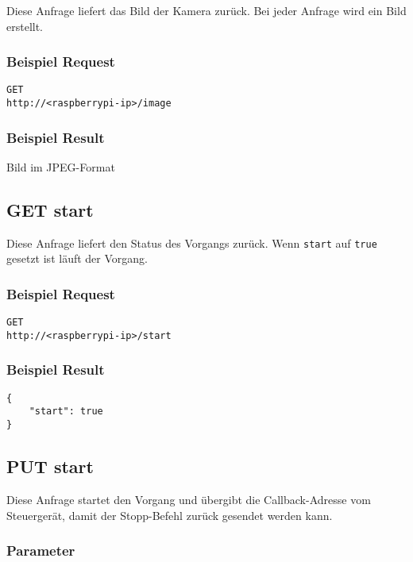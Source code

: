 Diese Anfrage liefert das Bild der Kamera zurück. Bei jeder Anfrage wird ein Bild erstellt.

\subsubsection{Beispiel Request}

\texttt{GET} \\
\texttt{http://<raspberrypi-ip>/image}

\subsubsection{Beispiel Result}

Bild im JPEG-Format

\subsection{GET start}

Diese Anfrage liefert den Status des Vorgangs zurück. Wenn \texttt{start} auf \texttt{true} gesetzt ist läuft der Vorgang.

\subsubsection{Beispiel Request}

\texttt{GET} \\
\texttt{http://<raspberrypi-ip>/start}

\subsubsection{Beispiel Result}

\begin{lstlisting}[caption=GET start Result, tabsize=2]
{
	"start": true
}
\end{lstlisting}

\subsection{PUT start}

Diese Anfrage startet den Vorgang und übergibt die Callback-Adresse vom Steuergerät, damit der Stopp-Befehl zurück gesendet werden kann.

\subsubsection{Parameter}

